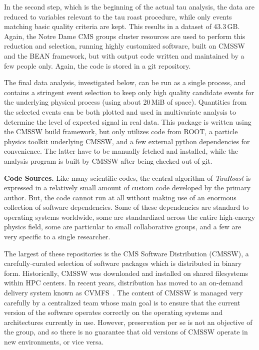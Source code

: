 \documentclass{acm_proc_article-sp}
\begin{document}
In the second step, which is the beginning of the actual tau analysis,
the data are reduced to variables relevant to the tau roast procedure, while
only events matching basic quality criteria are kept.  This results in
a dataset of 43.3$\,$GB.  Again, the Notre Dame CMS groups cluster
resources are used to perform this reduction and selection,
running highly customized software,
built on CMSSW and the BEAN framework,
but with output code written and maintained by a few people only.
Again, the code is stored in a git repository.

The final data analysis, investigated below, can be run as a single
process, and contains a stringent event selection to keep only high
quality candidate events for the underlying physical process (using
about 20$\,$MiB of space).  Quantities from the selected events can be
both plotted and used in multivariate analysis to determine the level
of expected signal in real data.
This package is written using the CMSSW build framework,
but only utilizes code from ROOT,
a particle physics toolkit underlying CMSSW,
and a few external python dependencies for convenience.
The latter have to be manually fetched and installed,
while the analysis program is built by CMSSW after being checked out of git.

{\bf Code Sources.} Like many scientific codes, the central algorithm
of \emph{TauRoast} is expressed in a relatively small amount of
custom code developed by the primary author.  But, the code cannot
run at all without making use of an enormous collection of software
dependencies.  Some of these dependencies are standard to operating
systems worldwide, some are standardized across the entire high-energy
physics field, some are particular to small collaborative groups,
and a few are very specific to a single researcher.

The largest of these repositories is the CMS Software Distribution (CMSSW),
a carefully-curated selection of software packages which is distributed
in binary form.  Historically, CMSSW was downloaded and installed on shared
filesystems within HPC centers.  In recent years, distribution has moved to
an on-demand delivery system known as CVMFS~\cite{cvmfs}.  The content
of CMSSW is managed very carefully by a centralized team whose main goal
is to ensure that the current version of the software operates correctly
on the operating systems and architectures currently in use.  However,
preservation per se is not an objective of the group, and so there is
no guarantee that old versions of CMSSW operate in new environments,
or vice versa. 
\end{document}
